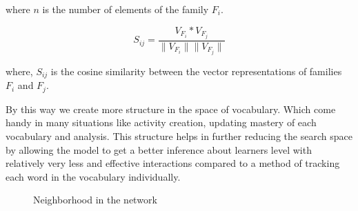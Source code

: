 \documentclass[11pt,a4paper]{article}
\begin{document}
where ${n}$ is the number of elements of the family ${F_i}$.

\begin{equation}
  S_{ij} = \frac{V_{F_i} * V_{F_j}}{\|V_{F_i}\|  \|V_{F_j}\|}
\end{equation}

where, ${S_{ij}}$ is the cosine similarity between the vector representations of
families ${F_i}$ and ${F_j}$.


By this way we create more structure in the space of vocabulary. Which come
handy in many situations like activity creation, updating mastery of each
vocabulary and analysis. This structure helps in further reducing the search space
by allowing the model to get a better inference about learners level with
relatively very less and effective interactions compared to a method of
tracking each word in the vocabulary individually.


\begin{figure}[hbt!]
  \centering
  \hspace{0mm}
  \caption{Neighborhood in the network}
  \label{fig:network}
\end{figure}
\end{document}
